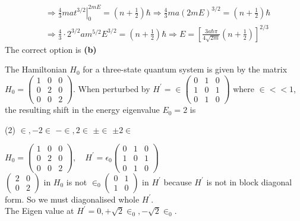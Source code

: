 \begin{enumerate}
\begin{answer}
$$\begin{aligned}
	&\left.\Rightarrow \frac{4}{3} m a t^{3 / 2}\right|_{0} ^{2 m E}=\left(n+\frac{1}{2}\right) \hbar \Rightarrow \frac{4}{3} m a(2 m E)^{3 / 2}=\left(n+\frac{1}{2}\right) \hbar \\
	&\Rightarrow \frac{4}{3} \cdot 2^{3 / 2} a m^{5 / 2} E^{3 / 2}=\left(n+\frac{1}{2}\right) \hbar \Rightarrow E=\left[\frac{3 a \hbar \pi}{4 \sqrt{2 m}}\left(n+\frac{1}{2}\right)\right]^{2 / 3}
	\end{aligned}$$
	The correct option is \textbf{(b)}
\end{answer}
\begin{minipage}{\textwidth}
	\item The Hamiltonian $H_{0}$ for a three-state quantum system is given by the matrix $H_{0}=\left(\begin{array}{lll}1 & 0 & 0 \\ 0 & 2 & 0 \\ 0 & 0 & 2\end{array}\right) .$ When perturbed by $H^{\prime}=\in\left(\begin{array}{lll}0 & 1 & 0 \\ 1 & 0 & 1 \\ 0 & 1 & 0\end{array}\right)$ where $\in<<1$, the resulting shift in the energy eigenvalue $E_{0}=2$ is
\end{minipage}
\begin{tasks}(2)
	\task[\textbf{A.}] $\in,-2 \in$
	\task[\textbf{B.}] $-\in, 2 \in$
	\task[\textbf{C.}]$\pm \in$
	\task[\textbf{D.}]$\pm 2 \in$
\end{tasks}
\begin{answer}
	$H_{0}=\left(\begin{array}{lll}
	1 & 0 & 0 \\
	0 & 2 & 0 \\
	0 & 0 & 2
	\end{array}\right), \quad H^{\prime}=\epsilon_{0}\left(\begin{array}{lll}
	0 & 1 & 0 \\
	1 & 0 & 1 \\
	0 & 1 & 0
	\end{array}\right)$\\
	$\left(\begin{array}{ll}2 & 0 \\ 0 & 2\end{array}\right)$ in $H_{0}$ is not $\in_{0}\left(\begin{array}{ll}0 & 1 \\ 1 & 0\end{array}\right)$ in $H^{\prime}$ because $H^{\prime}$ is not in block diagonal form. So we must diagonalised whole $H^{\prime}$.\\ The Eigen value at $H^{\prime}=0,+\sqrt{2} \in_{0},-\sqrt{2} \in_{0}$.\\

\end{answer}
\end{enumerate}
